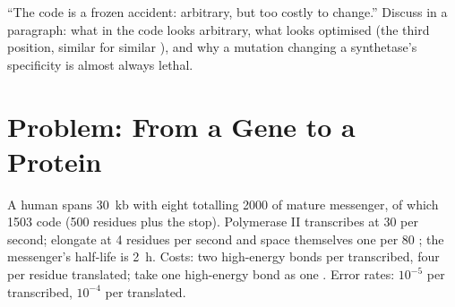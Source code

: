 \begin{exercise}[$\star\star\star$]\label{exo:b1:gene-expression:12}
``The code is a frozen accident: arbitrary, but too costly to change.''
Discuss in a paragraph: what in the code looks arbitrary, what looks
optimised (the third position, similar  for similar ), and why a mutation changing a synthetase's specificity is
almost always lethal.
\end{exercise}

\section{Problem: From a Gene to a Protein}

\begin{problem}
\label{pb:b1:gene-expression:1}
A human  spans \qty{30}{kb} with eight  totalling
\qty{2000}{}  of mature messenger, of which \qty{1503}{}
code (500 residues plus the stop). Polymerase II transcribes at
\qty{30}{}  per second;  elongate at \qty{4}{}
residues per second and space themselves one per \qty{80}{}
; the messenger's half-life is \qty{2}{h}. Costs: two
high-energy bonds per  transcribed, four per residue
translated; take one high-energy bond as one . Error rates:
$10^{-5}$ per  transcribed, $10^{-4}$ per  translated.


\end{problem}
